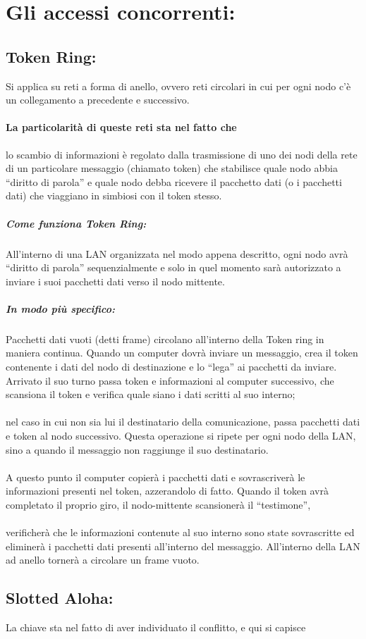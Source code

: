 \documentclass[12pt, a4paper, openany, twoside]{book}
\begin{document}
\section{Gli accessi concorrenti: }
\subsection{Token Ring: }
Si applica su reti a forma di anello, ovvero reti circolari in cui per ogni
nodo c'è un collegamento a precedente e successivo. 
\paragraph{La particolarità di queste reti sta nel fatto che }lo scambio di 
informazioni è regolato dalla trasmissione di uno dei nodi della rete di un 
particolare messaggio (chiamato token) che stabilisce quale nodo abbia “diritto
di parola” e quale nodo debba ricevere il pacchetto dati (o i pacchetti dati) 
che viaggiano in simbiosi con il token stesso. 
\subparagraph{Come funziona Token Ring: }
All'interno di una LAN organizzata nel modo appena descritto, ogni nodo avrà 
“diritto di parola” sequenzialmente e solo in quel momento sarà autorizzato a 
inviare i suoi pacchetti dati verso il nodo mittente.	
\subparagraph{In modo più specifico: }Pacchetti dati vuoti (detti frame) 
circolano all'interno della Token ring in maniera continua. Quando un computer 
dovrà inviare un messaggio, crea il token contenente i dati del nodo di 
destinazione e lo “lega” ai pacchetti da inviare. Arrivato il suo turno passa 
token e informazioni al computer successivo, che scansiona il token e verifica
quale siano i dati scritti al suo interno; 
\paragraph{}
nel caso in cui non sia lui il 
destinatario della comunicazione, passa pacchetti dati e token al nodo 
successivo. Questa operazione si ripete per ogni nodo della LAN, sino a quando 
il messaggio non raggiunge il suo destinatario. 
\paragraph{}
A questo punto il computer 
copierà i pacchetti dati e sovrascriverà le informazioni presenti nel token,
azzerandolo di fatto. Quando il token avrà completato il proprio giro, il
nodo-mittente scansionerà il “testimone”, 
\paragraph{}
verificherà che le informazioni 
contenute al suo interno sono state sovrascritte ed eliminerà i pacchetti 
dati presenti all'interno del messaggio. All'interno della LAN ad anello 
tornerà a circolare un frame vuoto.	


\subsection{Slotted Aloha: }	
La chiave sta nel fatto di aver individuato il conflitto, e qui si capisce
\end{document}

